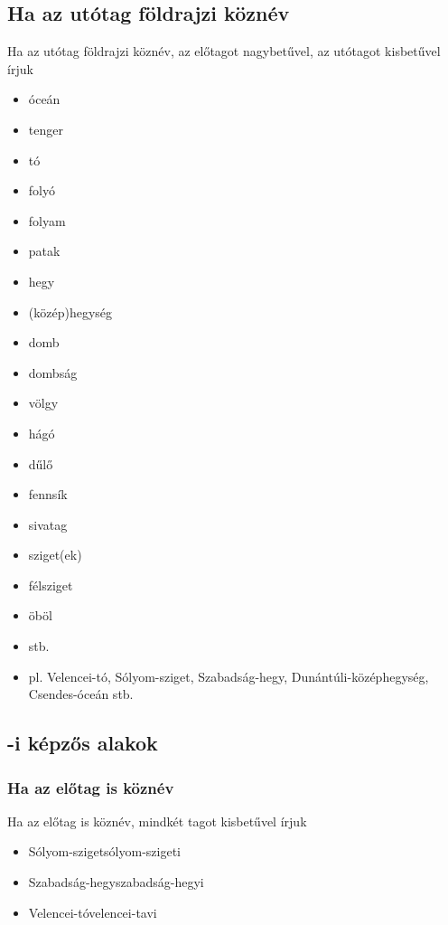 \documentclass{article}
\begin{document}
\subsection{Ha az utótag földrajzi köznév}
Ha az utótag földrajzi köznév, az előtagot nagybetűvel, az utótagot kisbetűvel írjuk
\begin{itemize}
    \item óceán 
    \item tenger 
    \item tó 
    \item folyó
    \item folyam
    \item patak
    \item hegy
    \item (közép)hegység
    \item domb
    \item dombság
    \item völgy
    \item hágó
    \item dűlő
    \item fennsík
    \item sivatag
    \item sziget(ek)
    \item félsziget
    \item öböl
    \item stb.
    \item pl. Velencei-tó, Sólyom-sziget, Szabadság-hegy, Dunántúli-középhegység, Csendes-óceán stb.
\end{itemize}

\subsection{-i képzős alakok}
\subsubsection{Ha az előtag is köznév}
Ha az előtag is köznév, mindkét tagot kisbetűvel írjuk
\begin{itemize}
    \item Sólyom-sziget\textrightarrow sólyom-szigeti
    \item Szabadság-hegy\textrightarrow  szabadság-hegyi
    \item Velencei-tó\textrightarrow  velencei-tavi
\end{itemize}
\end{document}
